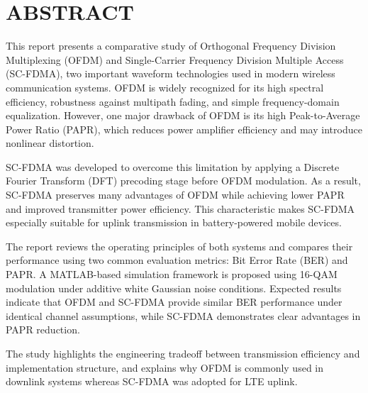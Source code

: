 \section*{ABSTRACT}

This report presents a comparative study of Orthogonal Frequency Division
Multiplexing (OFDM) and Single-Carrier Frequency Division Multiple Access
(SC-FDMA), two important waveform technologies used in modern wireless
communication systems. OFDM is widely recognized for its high spectral
efficiency, robustness against multipath fading, and simple frequency-domain
equalization. However, one major drawback of OFDM is its high
Peak-to-Average Power Ratio (PAPR), which reduces power amplifier
efficiency and may introduce nonlinear distortion.

SC-FDMA was developed to overcome this limitation by applying a Discrete
Fourier Transform (DFT) precoding stage before OFDM modulation. As a
result, SC-FDMA preserves many advantages of OFDM while achieving lower
PAPR and improved transmitter power efficiency. This characteristic makes
SC-FDMA especially suitable for uplink transmission in battery-powered
mobile devices.

The report reviews the operating principles of both systems and compares
their performance using two common evaluation metrics: Bit Error Rate
(BER) and PAPR. A MATLAB-based simulation framework is proposed using
16-QAM modulation under additive white Gaussian noise conditions. Expected
results indicate that OFDM and SC-FDMA provide similar BER performance
under identical channel assumptions, while SC-FDMA demonstrates clear
advantages in PAPR reduction.

The study highlights the engineering tradeoff between transmission
efficiency and implementation structure, and explains why OFDM is commonly
used in downlink systems whereas SC-FDMA was adopted for LTE uplink.

\newpage
\clearpage